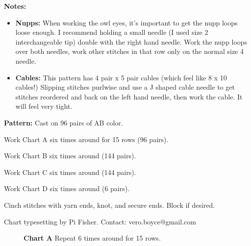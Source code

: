 \documentclass[11pt]{article}
\begin{document}
\smallskip
\textbf{Notes:}
\begin{itemize}
	\item \textbf{Nupps:} When working the owl eyes, it's important to get the nupp loops loose enough. I recommend holding a small needle (I used size 2 interchangeable tip) double with the right hand needle. Work the nupp loops over both needles, work other stitches in that row only on the normal size 4 needle. 
	\item \textbf{Cables:} This pattern has 4 pair x 5 pair cables (which feel like 8 x 10 cables!) Slipping stitches purlwise and use a J shaped cable needle to get stitches reordered and back on the left hand needle, then work the cable. It will feel very tight. 
\end{itemize}

\smallskip

\textbf{Pattern:}
Cast on 96 pairs of AB color. 

Work Chart A six times around for 15 rows (96 pairs). 

Work Chart B six times around (144 pairs). 

Work Chart C six times around (144 pairs). 

Work Chart D six times around (6 pairs). 

Cinch stitches with yarn ends, knot, and secure ends. Block if desired. 


\doclicenseThis Chart typesetting by Pi Fisher. Contact: vero.boyce@gmail.com

\newpage

\begin{figure}
	\centering
{} 
\caption*{\textbf{Chart A} Repeat 6 times around for 15 rows.\\}

\end{figure}
\end{document}
